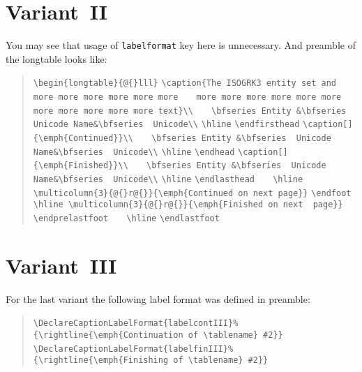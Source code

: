 \begingroup
{}
\let\LTcontcaption\LTcontcaptionI
\let\LTfincaption\LTfincaptionI


\endgroup

\clearpage
\section{Variant~II}

You may see that usage of \verb|labelformat| key here is unnecessary. 
And preamble of the \textsf{longtable} looks like:
\begin{quote}\obeylines\parskip0pt
\verb|\begin{longtable}{@{}lll}|
\verb|\caption{The ISOGRK3 entity set and more more more more more more|
\verb|   more more more more more more more more more more more text}\\|
\verb|   \bfseries Entity &\bfseries  Unicode Name&\bfseries  Unicode\\|
\verb|\hline|
\verb|\endfirsthead|
\verb|\caption[]{\emph{Continued}}\\|
\verb|   \bfseries Entity &\bfseries  Unicode Name&\bfseries  Unicode\\|
\verb|\hline|
\verb|\endhead|
\verb|\caption[]{\emph{Finished}}\\|
\verb|   \bfseries Entity &\bfseries  Unicode Name&\bfseries  Unicode\\|
\verb|\hline|
\verb|\endlasthead|
\verb|   \hline \multicolumn{3}{@{}r@{}}{\emph{Continued on next page}}|
\verb|\endfoot|
\verb|   \hline \multicolumn{3}{@{}r@{}}{\emph{Finished on next  page}}|
\verb|\endprelastfoot|
\verb|   \hline|
\verb|\endlastfoot|
\end{quote}


\begingroup
\captionsetup[table]{labelsep=period,singlelinecheck=no}
\let\LTcontcaption\LTcontcaptionII
\let\LTfincaption\LTfincaptionII


\endgroup

\clearpage
\section{Variant~III}

For the last variant the following label format was defined in preamble:
\begin{quote}\obeylines\parskip0pt
\verb|\DeclareCaptionLabelFormat{labelcontIII}%|
\verb|  {\rightline{\emph{Continuation of \tablename} #2}}|
\verb|\DeclareCaptionLabelFormat{labelfinIII}%|
\verb|  {\rightline{\emph{Finishing of \tablename} #2}}|
\end{quote}

